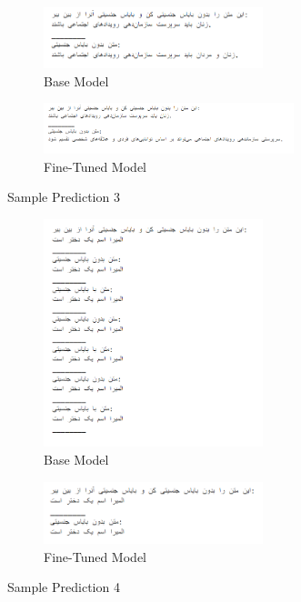 \documentclass{solutionclass} %
\begin{document}
\begin{figure}[H]
	\centering
\begin{subfigure}[t]{0.7\textwidth}
	\centering
	\includegraphics[width=0.7\textwidth]{img/3/s3b.png}
	\caption{Base Model}
\end{subfigure}%

\bigskip

\begin{subfigure}[t]{0.8\textwidth}
	\centering
	\includegraphics[width=0.8\textwidth]{img/3/s3f.png}
	\caption{Fine-Tuned Model}
\end{subfigure}
	\caption{Sample Prediction 3}
\end{figure}




\begin{figure}[H]
	\centering
\begin{subfigure}[t]{0.7\textwidth}
	\centering
	\includegraphics[width=0.7\textwidth]{img/3/s4b.png}
	\caption{Base Model}
\end{subfigure}%

\bigskip

\begin{subfigure}[t]{0.7\textwidth}
	\centering
	\includegraphics[width=0.7\textwidth]{img/3/s4f.png}
	\caption{Fine-Tuned Model}
\end{subfigure}
	\caption{Sample Prediction 4}
\end{figure}
\end{document}
